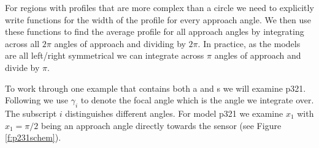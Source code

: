 \documentclass[a4paper,10pt,reqno,oneside]{amsart}
\begin{document}
For regions with profiles that are more complex than a circle we need to explicitly write functions for the width of the profile for every approach angle. We then use these functions to find the average profile for all approach angles by integrating across all $2\pi$ angles of approach and dividing by $2\pi$. In practice, as the models are all left/right symmetrical we can integrate across $\pi$ angles of approach and divide by $\pi$.

To work through one example that contains both a and s we will examine p321. Following \citep{rowcliffe2008estimating} we use $\gamma_i$ to denote the focal angle which is the angle we integrate over. The subscript $i$ distinguishes different angles. For model p321 we examine $x_1$ with  $x_1 = \pi/2$ being an approach angle directly towards the sensor (see Figure \ref{f:p231schem}).
\end{document}

